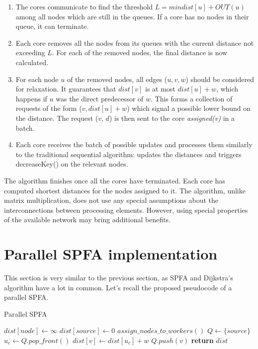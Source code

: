 \documentclass[12pt,a4paper,twoside,openright]{report}
\begin{document}
\begin{enumerate}
    \item The cores communicate to find the threshold $L = min{dist[u] + OUT(u)}$ among all nodes which are still in the queues. If a core has no nodes in their queue, it can terminate.
    \item Each core removes all the nodes from its queues with the current distance not exceeding $L$. For each of the removed nodes, the final distance is now calculated.
    \item For each node $u$ of the removed nodes, all edges ($u, v, w$) should be considered for relaxation. It guarantees that $dist[v]$ is at most $dist[u] + w$, which happens if $u$ was the direct predecessor of $w$. This forms a collection of requests of the form ($v, dist[u]+w$) which signal a possible lower bound on the distance. The request ($v$, $d$) is then sent to the core \textit{assigned(v)} in a batch.
    \item Each core receives the batch of possible updates and processes them similarly to the traditional sequential algorithm: updates the distances and triggers decreaseKey() on the relevant nodes.
\end{enumerate}

The algorithm finishes once all the cores have terminated. Each core has computed shortest distances for the nodes assigned to it. The algorithm, unlike matrix multiplication, does not use any special assumptions about the interconnections between processing elements. However, using special properties of the available network may bring additional benefits.

\section{Parallel SPFA implementation}
This section is very similar to the previous section, as SPFA and Dijkstra's algorithm have a lot in common. Let's recall the proposed pseudocode of a parallel SPFA.

\begin{algorithm}
\caption{Parallel SPFA}\label{pspfa2}
\begin{algorithmic}[1]
    \State $dist[node] \gets \infty$
\EndFor
\State $dist[source] \gets 0$
\State $assign\_nodes\_to\_workers()$
\State $Q \gets \{source\}$ 
        \State $u_c \gets Q.pop\_front()$
            \State $dist[v] \gets dist[u_c] + w$
                \State $Q.push(v)$
                \EndIf
        \EndIf
        \EndFor
      \EndFor
    \EndWhile
\State \textbf{return} $dist$
\EndProcedure
\end{algorithmic}
\end{algorithm}
\end{document}
